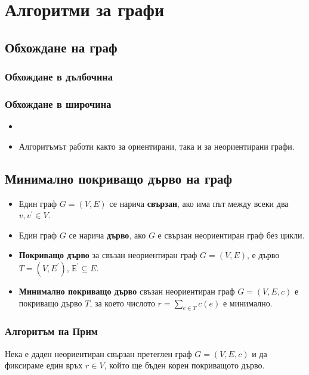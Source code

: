\chapter {Алгоритми за графи}

\section{Обхождане на граф}

\subsection{Обхождане в дълбочина}

\subsection{Обхождане в широчина}

\begin{itemize}
\item
  
\item 
  Алгоритъмът работи както за ориентирани, така и за неориентирани графи.
\end{itemize}

\section{Минимално покриващо дърво на граф}

\begin{itemize}
\item
  Един граф $G = (V,E)$ се нарича {\bf свързан}, ако има път между всеки два $v,v^\prime \in V$.
\item 
  Един граф $G$ се нарича {\bf дърво}, ако $G$ е свързан неориентиран граф без цикли.
\item
  {\bf Покриващо дърво} за свъзан неориентиран граф $G = (V,E)$,
  е дърво $T = (V,E^\prime)$, $Е^\prime \subseteq E$.
\item
  {\bf Минимално покриващо дърво} свъзан неориентиран граф $G = (V,E,c)$
  е покриващо дърво $T$, за което числото $r = \sum_{e\in T} c(e)$ е минимално.
\end{itemize}

\subsection{Алгоритъм на Прим}

Нека е даден неориентиран свързан претеглен граф $G = (V,E,c)$
и да фиксираме един връх $r \in V$, който ще бъден корен покриващото дърво.

